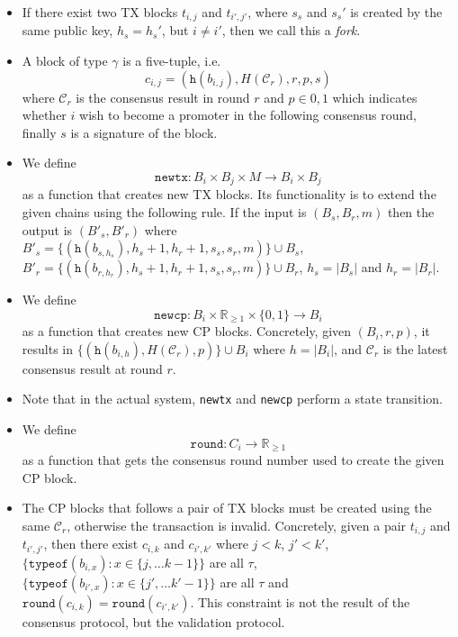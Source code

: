 \begin{itemize}
\item If there exist two TX blocks $t_{i,j}$ and $t_{i',j'}$, where $s_s$ and
  $s_s'$ is created by the same public key, $h_s = h_s'$, but $i \neq i'$, then
  we call this a \emph{fork}.

\item A block of type $\gamma$ is a five-tuple, i.e.
  $$c_{i,j} = (\texttt{h}(b_{i,j}), H(\mathcal{C}_r), r, p, s)$$
  where $\mathcal{C}_r$ is the consensus result in round $r$ and $p \in {0,1}$
  which indicates whether $i$ wish to become a promoter in the following
  consensus round, finally $s$ is a signature of the block.

\item We define
  $$\texttt{newtx}: B_i \times B_j \times M \rightarrow B_i \times B_j$$
  as a function that creates new TX blocks. Its functionality is to
  extend the given chains using the following rule. If the input is $(B_s, B_r,
  m)$ then the output is $(B'_s, B'_r)$ where $B'_s = \{(\texttt{h}(b_{s,h_s}), h_s + 1,
  h_r + 1, s_s, s_r, m)\} \cup B_s$, $B'_r = \{(\texttt{h}(b_{r, h_r}), h_s + 1, h_r + 1,
  s_s, s_r, m)\} \cup B_r$, $h_s = |B_s|$ and $h_r = |B_r|$.

\item We define
  $$\texttt{newcp}: B_i \times \mathbb{R}_{\ge 1} \times \{0, 1\} \rightarrow B_i$$
  as a function that creates new CP blocks. Concretely, given $(B_i, r, p)$, it
  results in $\{ (\texttt{h}(b_{i,h}), H(\mathcal{C}_r), p) \}\cup B_i$ where $h =
  |B_i|$, and $\mathcal{C}_r$ is the latest consensus result at round $r$.

\item Note that in the actual system, \texttt{newtx} and \texttt{newcp} perform
  a state transition.

\item We define
  $$\texttt{round}: C_i \rightarrow \mathbb{R}_{\ge 1}$$
  as a function that gets the consensus round number used to create the given CP
  block.

\item The CP blocks that follows a pair of TX blocks must be created using the
  same $\mathcal{C}_r$, otherwise the transaction is invalid. Concretely, given
  a pair $t_{i,j}$ and $t_{i',j'}$, then there exist $c_{i, k}$ and $c_{i', k'}$
  where $j < k$, $j' < k'$, $\{ \texttt{typeof}(b_{i, x}) : x \in \{j, \dots k -
  1\}\}$ are all $\tau$, $ \{ \texttt{typeof}(b_{i', x}) : x \in \{ j', \dots k'
  - 1\} \}$ are all $\tau$ and $\texttt{round}(c_{i, k}) = \texttt{round}(c_{i',
    k'})$. This constraint is not the result of the consensus protocol, but the
  validation protocol.


\end{itemize}
